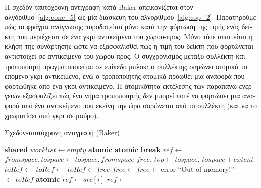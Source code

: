 \begin{greek}
Η σχεδόν ταυτόχρονη αντιγραφή κατά Baker απεικονίζεται στον
αλγόριθμο~\ref{alg:conc_5} ως μία διασκευή του αλγορίθμου~\ref{alg:cop_2}.
Παρατηρούμε πώς το φράγμα ανάγνωσης πυροδοτείται μόνο κατά
την φόρτωση της τιμής ενός δείκτη που περιέχεται σε ένα γκρι
αντικείμενο του χώρου-προς. Μόνο τότε απαιτείται η κλήση
της συνάρτησης  ώστε να εξασφαλισθεί πώς
η τιμή του δείκτη που φορτώνεται αντιστοιχεί σε αντικείμενο
του χώρου-προς. Ο συγχρονισμός μεταξύ συλλέκτη και τροποποιητή
πραγματοποιείται σε επίπεδο μπλοκ: ο συλλέκτης σαρώνει ατομικά
το επόμενο γκρι αντικείμενο, ενώ ο τροποποιητής ατομικά
προωθεί μια αναφορά που φορτώθηκε από ένα γκρι αντικείμενο.
Η ατομικότητα εκτέλεσης των παραπάνω ενεργειών εξασφαλίζει
πώς ένα νήμα τροποποιητής δεν μπορεί ποτέ να φορτώσει
μια αναφορά από ένα αντικείμενο που εκείνη την ώρα σαρώνεται
από το συλλέκτη (και να το χρωματίσει από γκρι σε μαύρο).

\begin{algorithm}[H]
  \caption{Σχεδόν-ταυτόχρονη αντιγραφή (Baker)}
  \label{alg:conc_5}
  \begin{algorithmic}[1]
    \State \textbf{shared} $worklist \gets empty$
      \State \textbf{atomic}
      \State {}
      \EndFor
      \Loop
        \State \textbf{atomic}
          \State \textbf{break}
        \EndIf
        \State $ref \gets$ 
        \State {}
      \EndLoop
    \EndProcedure
    \Statex
      \State $fromspace, tospace \gets tospace, fromspace$
      \State $free, \, top \gets tospace, \, tospace + extent$
    \EndProcedure
    \Statex
        \State {}
      \EndFor
    \EndProcedure
    \Statex
      \State $toRef \gets$ 
        \State $toRef \gets$ 
      \EndIf
      \State {}
    \EndProcedure
    \Statex
      \State $toRef \gets free$
      \State $free \gets free +$ 
        \State error ``Out of memory!''
      \EndIf
      \State {}
      \State {} $\gets toRef$
      \State {}
      \State {}
    \EndFunction
    \Statex
      \State \textbf{atomic}
      \State $ref \gets src[i]$
        \State $ref \gets$ 
      \EndIf
      \State {}
    \EndFunction
  \end{algorithmic}
\end{algorithm}


\end{greek}

